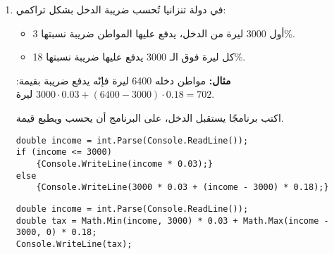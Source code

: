 \documentclass[12pt]{article}
\begin{document}
\begin{enumerate}[itemsep=2em]
\item
في دولة تنزانيا تُحسب ضريبة الدخل بشكل تراكمي:
\begin{itemize}
    \item أول 3000 ليرة من الدخل، يدفع عليها المواطن ضريبة نسبتها 3\%.
    \item كل ليرة فوق الـ 3000 يدفع عليها ضريبة نسبتها 18\%.
\end{itemize}
\textbf{مثال:} مواطن دخله 6400 ليرة فإنّه يدفع ضريبة بقيمة: $3000 \cdot 0.03 + (6400 - 3000) \cdot 0.18 = 702$ ليرة.

اكتب برنامجًا يستقبل الدخل، على البرنامج أن يحسب ويطبع قيمة.

\ifwithsols
\begin{boxSolution}[1]
\begin{english}
\begin{verbatim}
double income = int.Parse(Console.ReadLine());
if (income <= 3000)
    {Console.WriteLine(income * 0.03);}
else
    {Console.WriteLine(3000 * 0.03 + (income - 3000) * 0.18);}
\end{verbatim}
\end{english}
\end{boxSolution}
\begin{boxSolution}[2]
\begin{english}
\begin{verbatim}
double income = int.Parse(Console.ReadLine());
double tax = Math.Min(income, 3000) * 0.03 + Math.Max(income - 3000, 0) * 0.18;
Console.WriteLine(tax);
\end{verbatim}
\end{english}
\end{boxSolution}
\fi


\end{enumerate}
\end{document}
